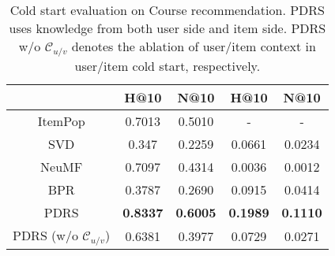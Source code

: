 \begin{table}
{\begin{tabular}{c|cc|cc}
     & \multicolumn{1}{c}{H@10} & \multicolumn{1}{c|}{N@10} & H@10& N@10      \\ 
    \midrule
    ItemPop    & 0.7013 & 0.5010     & -  & -    \\
    SVD        & 0.347  & 0.2259     & 0.0661 & 0.0234 \\
    NeuMF      & 0.7097 & 0.4314     & 0.0036 & 0.0012 \\
    BPR        & 0.3787 & 0.2690     & 0.0915 & 0.0414 \\ 
    \midrule
    PDRS                         & \textbf{0.8337} & \textbf{0.6005}    & \textbf{0.1989} & \textbf{0.1110}  \\
    PDRS (w/o $\mathcal{C}_{u/v}$)  & 0.6381 & 0.3977    & 0.0729 & 0.0271     \\ 
    \bottomrule
    \end{tabular}
    \caption{Cold start evaluation on Course recommendation.  PDRS uses knowledge from both user side and item side.  PDRS w/o $\mathcal{C}_{u/v}$ denotes the ablation of user/item context in user/item cold start, respectively.}
    \label{tab:cold}
}
\end{table}



